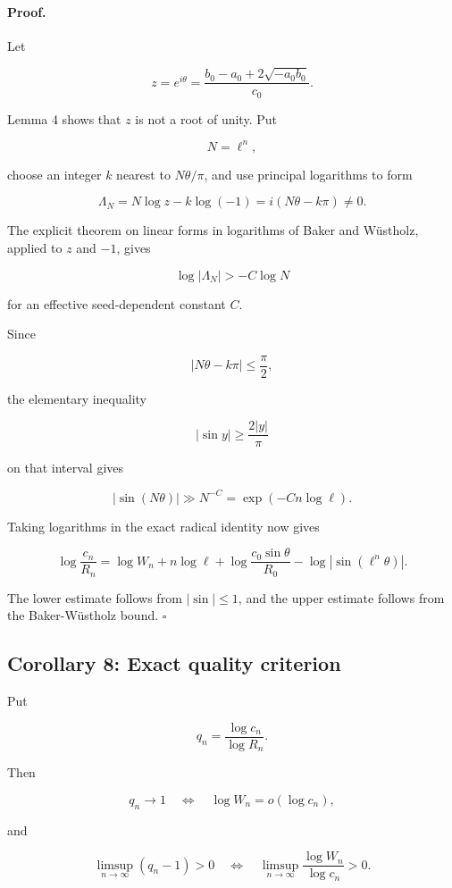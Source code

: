 \documentclass[11pt]{article}
\begin{document}
\paragraph{Proof.}

Let

\[
z=e^{i\theta}
=
\frac{b_0-a_0+2\sqrt{-a_0b_0}}{c_0}.
\]

Lemma 4 shows that \(z\) is not a root of unity. Put

\[
N=\ell^n,
\]

choose an integer \(k\) nearest to \(N\theta/\pi\), and use principal
logarithms to form

\[
\Lambda_N
=
N\log z-k\log(-1)
=
i(N\theta-k\pi)
\neq0.
\]

The explicit theorem on linear forms in logarithms of Baker and Wüstholz,
applied to \(z\) and \(-1\), gives

\[
\log|\Lambda_N|
>
-C\log N
\]

for an effective seed-dependent constant \(C\).

Since

\[
|N\theta-k\pi|
\leq
\frac{\pi}{2},
\]

the elementary inequality

\[
|\sin y|
\geq
\frac{2|y|}{\pi}
\]

on that interval gives

\[
|\sin(N\theta)|
\gg
N^{-C}
=
\exp(-Cn\log\ell).
\]

Taking logarithms in the exact radical identity now gives

\[
\log\frac{c_n}{R_n}
=
\log W_n
+n\log\ell
+\log\frac{c_0\sin\theta}{R_0}
-\log|\sin(\ell^n\theta)|.
\]

The lower estimate follows from \(|\sin|\leq1\), and the upper estimate
follows from the Baker-Wüstholz bound. \(\square\)

\subsection{Corollary 8: Exact quality criterion}

Put

\[
q_n=\frac{\log c_n}{\log R_n}.
\]

Then

\[
q_n\longrightarrow1
\quad\Longleftrightarrow\quad
\log W_n=o(\log c_n),
\]

and

\[
\limsup_{n\to\infty}(q_n-1)>0
\quad\Longleftrightarrow\quad
\limsup_{n\to\infty}
\frac{\log W_n}{\log c_n}>0.
\]
\end{document}
